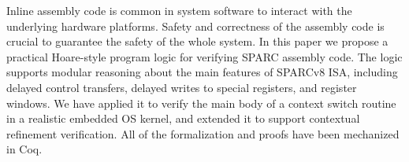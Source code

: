 Inline assembly code is common in system software to interact with
the underlying hardware platforms. Safety and correctness of the
assembly code is crucial to guarantee the safety of the whole
system. In this paper we propose a practical Hoare-style program
logic for verifying SPARC assembly code. The logic supports
modular reasoning about the main features of SPARCv8 ISA, including
delayed control transfers, delayed writes to special registers,
and register windows. We have applied it
to verify the main body of a context switch routine in a realistic 
embedded OS kernel, and extended it to support 
contextual refinement verification.
All of the formalization and proofs have been mechanized in Coq. 